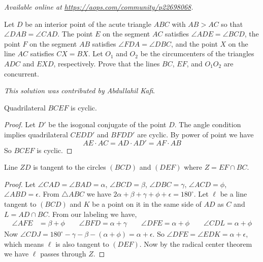 \textsl{Available online at \url{https://aops.com/community/p22698068}.}
\begin{mdframed}[style=mdpurplebox,frametitle={Problem statement}]
Let $D$ be an interior point of the acute triangle $ABC$
with $AB > AC$ so that $\angle DAB = \angle CAD$.
The point $E$ on the segment $AC$ satisfies $\angle ADE =\angle BCD$,
the point $F$ on the segment $AB$ satisfies $\angle FDA =\angle DBC$,
and the point $X$ on the line $AC$ satisfies $CX = BX$.
Let $O_1$ and $O_2$ be the circumcenters of the triangles
$ADC$ and $EXD$, respectively.
Prove that the lines $BC$, $EF$, and $O_1O_2$ are concurrent.
\end{mdframed}
\emph{This solution was contributed by Abdullahil Kafi}.


\begin{claim*}
    Quadrilateral $BCEF$ is cyclic.
\end{claim*}

\begin{proof}
    Let $D'$ be the isogonal conjugate of the point $D$. The
    angle condition implies quadrilateral $CEDD'$ and $BFDD'$
    are cyclic. By power of point we have \[ AE\cdot AC=AD\cdot AD'=AF\cdot AB \]
    So $BCEF$ is cyclic.
\end{proof}

\begin{claim*}
    Line $ZD$ is tangent to the circles $(BCD)$ and $(DEF)$
    where $Z=EF\cap BC$.
\end{claim*}

\begin{proof}
    Let $\angle CAD=\angle BAD=\alpha$, $\angle BCD=\beta$,
    $\angle DBC=\gamma$, $\angle ACD=\phi$,
    $\angle ABD=\epsilon$.
    From $\triangle ABC$ we have
    $2\alpha+\beta+\gamma+\phi+\epsilon=180^\circ$.
    Let $\ell$ be a line tangent to $(BCD)$ and $K$ be a
    point on it in the same side of $AD$ as $C$ and
    $L=AD\cap BC$. From our labeling we have,
    \begin{align*}
	    \angle AFE &= \beta + \phi \qquad \angle BFD =
	    \alpha + \gamma \qquad \angle DFE = \alpha + \phi
	    \qquad \angle CDL = \alpha + \phi
    \end{align*}
    Now $\angle CDJ = 180^\circ - \gamma - \beta - (\alpha + \phi) = \alpha + \epsilon$.
    So $\angle DFE = \angle EDK = \alpha + \epsilon$, which
    means $\ell$ is also tangent to $(DEF)$. Now by the
    radical center theorem we have $\ell$ passes through
    $Z$.
\end{proof}

